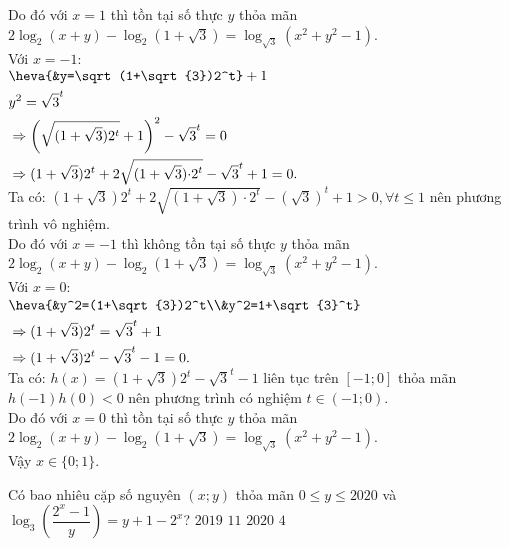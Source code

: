 \begin{ex}
{		Do đó với $x=1$ thì tồn tại số thực $y$ thỏa mãn $2\log_2(x+y)-\log_2(1+\sqrt{3})=\log_{\sqrt{3}}\left(x^2+y^2-1\right)$.\\
		Với $x=-1$:\\
		$\begin{aligned}&\heva{&y=\sqrt(1+\sqrt{3})2^t}+1\\&y^2={\sqrt{3}}^t\\&\Rightarrow \left(\sqrt{(1+\sqrt{3})2^t}+1\right)^2-\sqrt{3}^t=0\\&\Rightarrow(1+\sqrt{3})2^t+2\sqrt{(1+\sqrt{3}){\cdot 2}^t}-\sqrt{3}^t+1=0.\end{aligned}$ \\
		Ta có: $(1+\sqrt{3})2^t+2\sqrt{(1+\sqrt{3})\cdot 2^t}-(\sqrt{3})^t+1>0,\forall t\leq 1$ nên phương trình vô nghiệm.\\
		Do đó với $x=-1$ thì không tồn tại số thực $y$ thỏa mãn $2\log_2(x+y)-\log_2(1+\sqrt{3})=\log_{\sqrt{3}}\left(x^2+y^2-1\right)$.\\
		Với $x=0$:\\
		$\begin{aligned}&\heva{&y^2=(1+\sqrt{3})2^t\\&y^2=1+\sqrt{3}^t}\\&\Rightarrow(1+\sqrt{3})2^t={\sqrt{3}}^t+1\\&\Rightarrow(1+\sqrt{3})2^t-\sqrt{3}^t-1=0.\end{aligned}$ \\
		Ta có: $h(x)=(1+\sqrt{3})2^t-\sqrt3^t-1$ liên tục trên $[-1;0]$ thỏa mãn $h(-1)h(0)<0$ nên phương trình có nghiệm $t\in(-1;0)$.\\
		Do đó với $x=0$ thì tồn tại số thực $y$ thỏa mãn $2\log_2(x+y)-\log_2(1+\sqrt{3})=\log_{\sqrt{3}}\left(x^2+y^2-1\right)$.\\
		Vậy $x\in\{0;1\}$.
	}
\end{ex}
\begin{ex}
	Có bao nhiêu cặp số nguyên $(x;y)$ thỏa mãn $0\leq y\leq 2020$ và $\log_3\left(\dfrac{2^x-1}{y}\right)=y+1-2^x$? 
	\choice
	{$2019$}
	{\True $11$}
	{$2020$}
	{$4$}
\end{ex}
